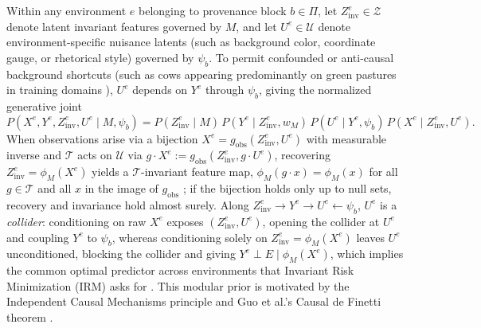 \documentclass[11pt,a4paper]{article}
\theoremstyle{definition}
\theoremstyle{remark}
\begin{document}
Within any environment $e$ belonging to provenance block $b \in \Pi$, let $Z_{\mathrm{inv}}^e \in \mathcal{Z}$ denote latent invariant features governed by $M$, and let $U^e \in \mathcal{U}$ denote environment-specific nuisance latents (such as background color, coordinate gauge, or rhetorical style) governed by $\psi_b$. To permit confounded or anti-causal background shortcuts (such as cows appearing predominantly on green pastures in training domains \cite{beery2018recognition,lopezpaz2026against}), $U^e$ depends on $Y^e$ through $\psi_b$, giving the normalized generative joint
\begin{equation}
  P(X^e, Y^e, Z_{\mathrm{inv}}^e, U^e \mid M, \psi_b)
  = P(Z_{\mathrm{inv}}^e \mid M) \, P(Y^e \mid Z_{\mathrm{inv}}^e, w_M) \, P(U^e \mid Y^e, \psi_b) \, P(X^e \mid Z_{\mathrm{inv}}^e, U^e).
  \label{eq:clean_joint}
\end{equation}
When observations arise via a bijection $X^e = g_{\mathrm{obs}}(Z_{\mathrm{inv}}^e, U^e)$ with measurable inverse and $\mathcal{T}$ acts on $\mathcal{U}$ via $g \cdot X^e := g_{\mathrm{obs}}(Z_{\mathrm{inv}}^e, g \cdot U^e)$, recovering $Z_{\mathrm{inv}}^e = \phi_M(X^e)$ yields a $\mathcal{T}$-invariant feature map, $\phi_M(g \cdot x) = \phi_M(x)$ for all $g \in \mathcal{T}$ and all $x$ in the image of $g_{\mathrm{obs}}$ \cite{vanfraassen1989laws}; if the bijection holds only up to null sets, recovery and invariance hold almost surely. Along $Z_{\mathrm{inv}}^e \to Y^e \to U^e \leftarrow \psi_b$, $U^e$ is a \emph{collider}: conditioning on raw $X^e$ exposes $(Z_{\mathrm{inv}}^e, U^e)$, opening the collider at $U^e$ and coupling $Y^e$ to $\psi_b$, whereas conditioning solely on $Z_{\mathrm{inv}}^e = \phi_M(X^e)$ leaves $U^e$ unconditioned, blocking the collider and giving $Y^e \perp E \mid \phi_M(X^e)$, which implies the common optimal predictor across environments that Invariant Risk Minimization (IRM) asks for \cite{arjovsky2019invariant}. This modular prior is motivated by the Independent Causal Mechanisms principle \cite{janzing2010causal,peters2016causal,geiger2025priors} and Guo et al.'s Causal de Finetti theorem \cite{guo2023causal}.
\end{document}
